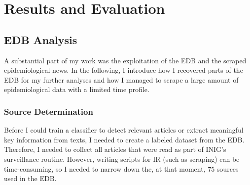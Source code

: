 \chapter{Results and Evaluation}

\section{EDB Analysis}\label{edb analysis}
  A substantial part of my work was the exploitation of the EDB and the scraped epidemiological news.
  In the following, I introduce how I recovered parts of the EDB for my further analyses and how I managed to scrape a large amount of epidemiological data with a limited time profile.

\subsection{Source Determination}\label{source determination}
  Before I could train a classifier to detect relevant articles or extract meaningful key information from texts, I needed to create a labeled dataset from the EDB.
  Therefore, I needed to collect all articles that were read as part of INIG's surveillance routine.
  However, writing scripts for IR (such as scraping) can be time-consuming, so I needed to narrow down the, at that moment, 75 sources used in the EDB.

